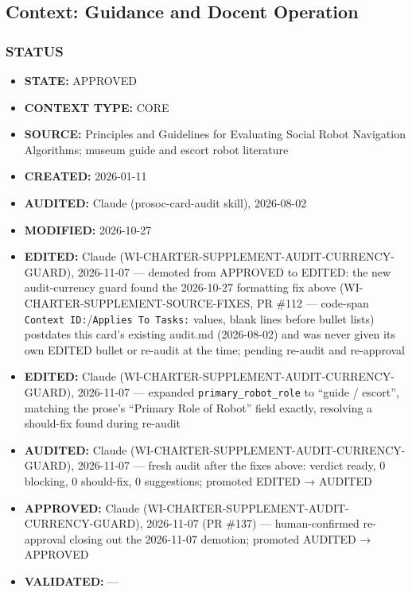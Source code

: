 \documentclass[utf8]{frontiers_suppmat} %
\providecommand{\tightlist}{%
  \setlength{\itemsep}{0pt}\setlength{\parskip}{0pt}}
\begin{document}
\subsection{Context: Guidance and Docent
Operation}\label{context-guidance-and-docent-operation}

\subsubsection{STATUS}\label{status}

\begin{itemize}
\tightlist
\item
  \textbf{STATE:} APPROVED
\item
  \textbf{CONTEXT TYPE:} CORE
\item
  \textbf{SOURCE:} Principles and Guidelines for Evaluating Social Robot
  Navigation Algorithms; museum guide and escort robot literature
\item
  \textbf{CREATED:} 2026-01-11
\item
  \textbf{AUDITED:} Claude (prosoc-card-audit skill), 2026-08-02
\item
  \textbf{MODIFIED:} 2026-10-27
\item
  \textbf{EDITED:} Claude (WI-CHARTER-SUPPLEMENT-AUDIT-CURRENCY-GUARD),
  2026-11-07 --- demoted from APPROVED to EDITED: the new audit-currency
  guard found the 2026-10-27 formatting fix above
  (WI-CHARTER-SUPPLEMENT-SOURCE-FIXES, PR \#112 --- code-span
  \texttt{Context ID:}/\texttt{Applies To Tasks:}
  values, blank lines before bullet lists) postdates this card's
  existing audit.md (2026-08-02) and was never given its own EDITED
  bullet or re-audit at the time; pending re-audit and re-approval
\item
  \textbf{EDITED:} Claude (WI-CHARTER-SUPPLEMENT-AUDIT-CURRENCY-GUARD),
  2026-11-07 --- expanded \texttt{primary\_robot\_role}
  to ``guide / escort'', matching the prose's ``Primary Role of Robot''
  field exactly, resolving a should-fix found during re-audit
\item
  \textbf{AUDITED:} Claude (WI-CHARTER-SUPPLEMENT-AUDIT-CURRENCY-GUARD),
  2026-11-07 --- fresh audit after the fixes above: verdict ready, 0
  blocking, 0 should-fix, 0 suggestions; promoted EDITED → AUDITED
\item
  \textbf{APPROVED:} Claude
  (WI-CHARTER-SUPPLEMENT-AUDIT-CURRENCY-GUARD), 2026-11-07 (PR \#137)
  --- human-confirmed re-approval closing out the 2026-11-07 demotion;
  promoted AUDITED → APPROVED
\item
  \textbf{VALIDATED:} ---
\end{itemize}
\end{document}
